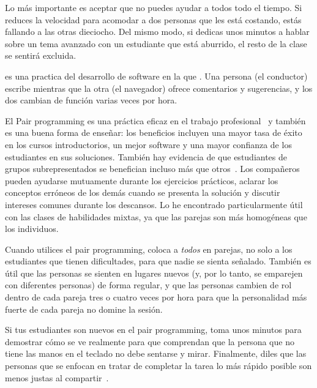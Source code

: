 Lo más importante es aceptar que
no puedes ayudar a todos todo el tiempo.
Si reduces la velocidad para acomodar a dos personas que les está costando,
estás fallando a las otras dieciocho.
Del mismo modo,
si dedicas unos minutos a hablar sobre un tema avanzado con un estudiante que está aburrido,
el resto de la clase se sentirá excluida.


 es una practica del desarrollo de software
en la que .
Una persona (el conductor) escribe
mientras que la otra (el navegador) ofrece comentarios y sugerencias,
y los dos cambian de función varias veces por hora.

El Pair programming es una práctica eficaz en el trabajo profesional~\cite{Hann2009}
y también es una buena forma de enseñar:
los beneficios incluyen una mayor tasa de éxito en los cursos introductorios,
un mejor software
y una mayor confianza de los estudiantes en sus soluciones.
También hay evidencia de que estudiantes de grupos subrepresentados
se benefician incluso más que otros~\cite{McDo2006,Hank2011,Port2013,Cele2018}.
Los compañeros pueden ayudarse mutuamente durante los ejercicios prácticos,
aclarar los conceptos erróneos de los demás cuando se presenta la solución
y discutir intereses comunes durante los descansos.
Lo he encontrado particularmente útil con las clases de habilidades mixtas,
ya que las parejas son más homogéneas que los individuos.

Cuando utilices el pair programming,
coloca a \emph{todos} en parejas,
no solo a los estudiantes que tienen dificultades,
para que nadie se sienta señalado.
También es útil que las personas se sienten en lugares nuevos
(y, por lo tanto, se emparejen con diferentes personas)
de forma regular,
y que las personas cambien de rol dentro de cada pareja tres o cuatro veces por hora
para que la personalidad más fuerte de cada pareja no domine la sesión.

Si tus estudiantes son nuevos en el pair programming,
toma unos minutos para demostrar cómo se ve realmente
para que comprendan que
la persona que no tiene las manos en el teclado
no debe sentarse y mirar.
Finalmente,
diles que las personas que se enfocan en tratar de completar la tarea lo más rápido posible
son menos justas al compartir~\cite{Lewi2015}.

